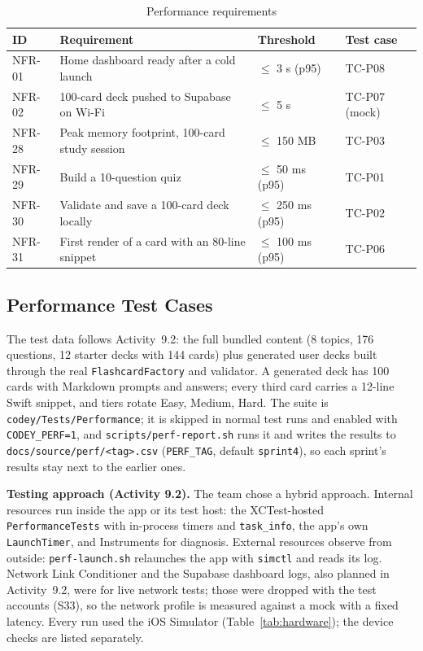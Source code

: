 \documentclass[12pt,letterpaper]{article}
\begin{document}
\begin{table}[H]
\centering
\caption{Performance requirements}
\label{tab:perfreq}
\begin{tabularx}{\textwidth}{@{}l Y L{2.0cm} L{3.0cm}@{}}
\toprule
\textbf{ID} & \textbf{Requirement} & \textbf{Threshold} & \textbf{Test case} \\
\midrule
NFR-01 & Home dashboard ready after a cold launch & $\le$ 3 s (p95) & TC-P08 \\
NFR-02 & 100-card deck pushed to Supabase on Wi-Fi & $\le$ 5 s & TC-P07 (mock) \\
NFR-28 & Peak memory footprint, 100-card study session & $\le$ 150 MB & TC-P03 \\
NFR-29 & Build a 10-question quiz & $\le$ 50 ms (p95) & TC-P01 \\
NFR-30 & Validate and save a 100-card deck locally & $\le$ 250 ms (p95) & TC-P02 \\
NFR-31 & First render of a card with an 80-line snippet & $\le$ 100 ms (p95) & TC-P06 \\
\bottomrule
\end{tabularx}
\end{table}

\subsection{Performance Test Cases}
The test data follows Activity~9.2: the full bundled content (8 topics, 176 questions,
12 starter decks with 144 cards) plus generated user decks built through the real
\texttt{FlashcardFactory} and validator. A generated deck has 100 cards with Markdown
prompts and answers; every third card carries a 12-line Swift snippet, and tiers
rotate Easy, Medium, Hard. The suite is \texttt{codey/Tests/Performance}; it is
skipped in normal test runs and enabled with \texttt{CODEY\_PERF=1}, and
\texttt{scripts/perf-report.sh} runs it and writes the results to
\texttt{docs/source/perf/<tag>.csv} (\texttt{PERF\_TAG}, default \texttt{sprint4}), so
each sprint's results stay next to the earlier ones.

\textbf{Testing approach (Activity 9.2).} The team chose a hybrid approach. Internal
resources run inside the app or its test host: the XCTest-hosted
\texttt{PerformanceTests} with in-process timers and \texttt{task\_info}, the app's
own \texttt{LaunchTimer}, and Instruments for diagnosis. External resources observe
from outside: \texttt{perf-launch.sh} relaunches the app with \texttt{simctl} and
reads its log. Network Link Conditioner and the Supabase dashboard logs, also planned
in Activity~9.2, were for live network tests; those were dropped with the test
accounts (S33), so the network profile is measured against a mock with a fixed
latency. Every run used the iOS Simulator (Table~\ref{tab:hardware}); the device
checks are listed separately.
\end{document}
